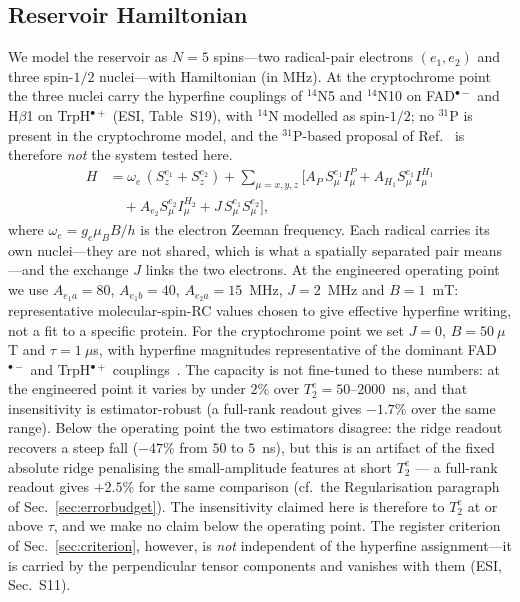 \documentclass[aps,prx,reprint,superscriptaddress,nofootinbib,floatfix]{revtex4-2}
\begin{document}
\subsection{Reservoir Hamiltonian}
We model the reservoir as $N=5$ spins---two radical-pair electrons
$(e_1,e_2)$ and three spin-$1/2$ nuclei---with Hamiltonian
(in MHz). At the cryptochrome point the three nuclei carry the hyperfine
couplings of $^{14}$N5 and $^{14}$N10 on FAD$^{\bullet-}$ and H$\beta$1 on
TrpH$^{\bullet+}$ (ESI, Table~S19), with $^{14}$N modelled as
spin-$1/2$; no $^{31}$P is present in the cryptochrome model, and the
$^{31}$P-based proposal of Ref.~\cite{Fisher2015} is therefore \emph{not} the
system tested here.
\begin{align}
H &= \omega_e\,(S_z^{e_1}+S_z^{e_2})
   + \sum_{\mu=x,y,z}\Big[
     A_P\,S_\mu^{e_1}I_\mu^{P}
   + A_{H_1}S_\mu^{e_1}I_\mu^{H_1} \nonumber\\
&\quad
   + A_{e_2}S_\mu^{e_2}I_\mu^{H_2}
   + J\,S_\mu^{e_1}S_\mu^{e_2}\Big],
\label{eq:H}
\end{align}
where $\omega_e=g_e\mu_B B/h$ is the electron Zeeman frequency. Each radical carries
its own nuclei---they are not shared, which is what a spatially separated pair
means---and the exchange $J$ links the two electrons. At the engineered operating
point we use $A_{e_1a}=80$, $A_{e_1b}=40$, $A_{e_2a}=15$~MHz, $J=2$~MHz and
$B=1$~mT: representative molecular-spin-RC values chosen to give effective hyperfine
writing, not a fit to a specific protein. For the cryptochrome point we set $J=0$,
$B=50~\mu$T and $\tau=1~\mu$s, with hyperfine magnitudes representative of the
dominant FAD$^{\bullet-}$ and TrpH$^{\bullet+}$ couplings~\cite{Lee2014,Schleicher2021}.
The capacity is not fine-tuned to these numbers: at the engineered point it
varies by under $2\%$ over $T_2^e=50$--$2000$~ns, and that insensitivity is
estimator-robust (a full-rank readout gives $-1.7\%$ over the same range).
Below the operating point the two estimators disagree: the ridge readout
recovers a steep fall ($-47\%$ from $50$ to $5$~ns), but this is an artifact
of the fixed absolute ridge penalising the small-amplitude features at short
$T_2^e$ --- a full-rank readout gives $+2.5\%$ for the same comparison
(cf.\ the Regularisation paragraph of Sec.~\ref{sec:errorbudget}). The
insensitivity claimed here is therefore to $T_2^e$ at or above $\tau$, and we
make no claim below the operating point. The register
criterion of Sec.~\ref{sec:criterion}, however, is \emph{not} independent of the
hyperfine assignment---it is carried by the perpendicular tensor components and
vanishes with them (ESI, Sec.~S11).
\end{document}
